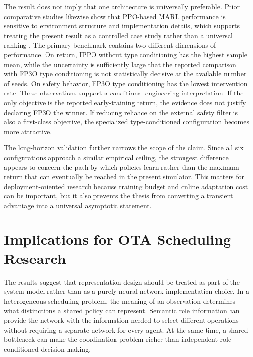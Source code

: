 \documentclass{iutbscthesis}
\begin{document}
The result does not imply that one architecture is universally preferable. Prior comparative studies likewise show that PPO-based MARL performance is sensitive to environment structure and implementation details, which supports treating the present result as a controlled case study rather than a universal ranking \parencite{yu2022surprising,feng2023fp3o,zhong2023harl}. The primary benchmark contains two different dimensions of performance. On return, IPPO without type conditioning has the highest sample mean, while the uncertainty is sufficiently large that the reported comparison with FP3O type conditioning is not statistically decisive at the available number of seeds. On safety behavior, FP3O type conditioning has the lowest intervention rate. These observations support a conditional engineering interpretation. If the only objective is the reported early-training return, the evidence does not justify declaring FP3O the winner. If reducing reliance on the external safety filter is also a first-class objective, the specialized type-conditioned configuration becomes more attractive.

The long-horizon validation further narrows the scope of the claim. Since all six configurations approach a similar empirical ceiling, the strongest difference appears to concern the path by which policies learn rather than the maximum return that can eventually be reached in the present simulator. This matters for deployment-oriented research because training budget and online adaptation cost can be important, but it also prevents the thesis from converting a transient advantage into a universal asymptotic statement.

\section{Implications for OTA Scheduling Research}
The results suggest that representation design should be treated as part of the system model rather than as a purely neural-network implementation choice. In a heterogeneous scheduling problem, the meaning of an observation determines what distinctions a shared policy can represent. Semantic role information can provide the network with the information needed to select different operations without requiring a separate network for every agent. At the same time, a shared bottleneck can make the coordination problem richer than independent role-conditioned decision making.
\end{document}
